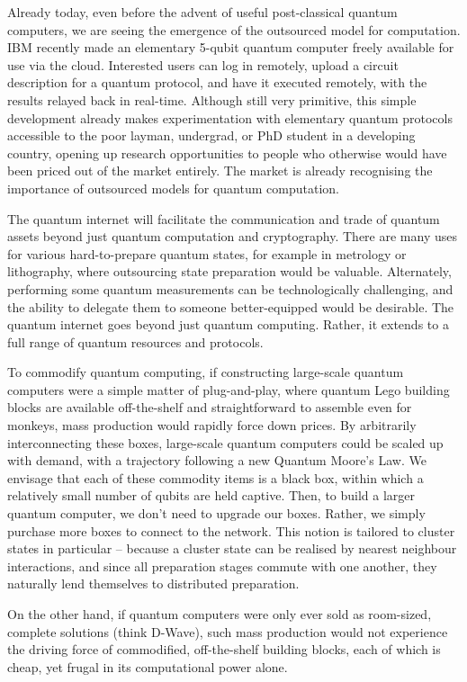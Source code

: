 \documentclass[aps,rmp,twocolumn,amsmath,amssymb,nofootinbib,superscriptaddress,longbibliography,floatfix]{revtex4-1}
\begin{document}
Already today, even before the advent of useful post-classical quantum computers, we are seeing the emergence of the outsourced model for computation. IBM recently made an elementary 5-qubit quantum computer freely available for use via the cloud. Interested users can log in remotely, upload a circuit description for a quantum protocol, and have it executed remotely, with the results relayed back in real-time. Although still very primitive, this simple development already makes experimentation with elementary quantum protocols accessible to the poor layman, undergrad, or PhD student in a developing country, opening up research opportunities to people who otherwise would have been priced out of the market entirely. The market is already recognising the importance of outsourced models for quantum computation.

The quantum internet will facilitate the communication and trade of quantum assets beyond just quantum computation and cryptography. There are many uses for various hard-to-prepare quantum states, for example in metrology or lithography, where outsourcing state preparation would be valuable. Alternately, performing some quantum measurements can be technologically challenging, and the ability to delegate them to someone better-equipped would be desirable. The quantum internet goes beyond just quantum computing. Rather, it extends to a full range of quantum resources and protocols.

To commodify quantum computing, if constructing large-scale quantum computers were a simple matter of plug-and-play, where quantum Lego building blocks are available off-the-shelf and straightforward to assemble even for monkeys, mass production would rapidly force down prices. By arbitrarily interconnecting these boxes, large-scale quantum computers could be scaled up with demand, with a trajectory following a new Quantum Moore's Law. We envisage that each of these commodity items is a black box, within which a relatively small number of qubits are held captive. Then, to build a larger quantum computer, we don't need to upgrade our boxes. Rather, we simply purchase more boxes to connect to the network. This notion is tailored to cluster states in particular -- because a cluster state can be realised by nearest neighbour interactions, and since all preparation stages commute with one another, they naturally lend themselves to distributed preparation.

On the other hand, if quantum computers were only ever sold as room-sized, complete solutions (think D-Wave), such mass production would not experience the driving force of commodified, off-the-shelf building blocks, each of which is cheap, yet frugal in its computational power alone.
\end{document}
